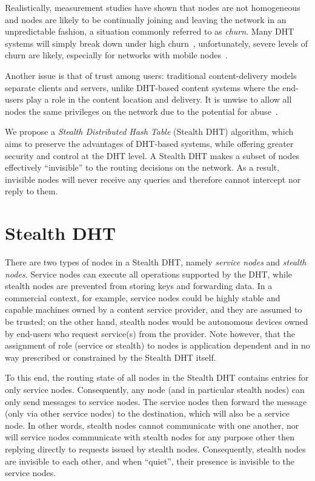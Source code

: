 \documentclass{sig-alt-release}
\begin{document}
Realistically, measurement studies have shown that nodes are not
homogeneous~\cite{sgg02} and nodes are likely to be continually
joining and leaving the network in an unpredictable fashion, a
situation commonly referred to as {\em churn}. Many DHT systems will
simply break down under high churn~\cite{churn1}, unfortunately,
severe levels of churn are likely, especially for networks with
mobile nodes~\cite{mobilechurn}\cite{dhtmanet01}.

Another issue is that of trust among users: traditional
content-delivery models separate clients and servers, unlike
DHT-based content systems where the end-users play a role in the
content location and delivery. It is unwise to allow all nodes the
same privileges on the network due to the potential for
abuse~\cite{dhtsec}\cite{DDoS_p2p05}.

We propose  a {\em Stealth Distributed Hash Table} (Stealth DHT)
algorithm, which aims to preserve the advantages of DHT-based
systems, while offering greater security and control at the DHT
level. A Stealth DHT makes a subset of nodes effectively
``invisible'' to the routing decisions on the network. As a result,
invisible nodes will never receive any queries and therefore cannot
intercept nor reply to them.

\section{Stealth DHT}
\label{sect:stealth}

There are two types of nodes in a Stealth DHT, namely {\em service
nodes} and {\em stealth nodes}. Service nodes can execute all
operations supported by the DHT, while stealth nodes are prevented
from storing keys and forwarding data. In a commercial context, for
example, service nodes could be highly stable and capable machines
owned by a content service provider, and they are assumed to be
trusted; on the other hand, stealth nodes would be autonomous
devices owned by end-users who request service(s) from the provider.
Note however, that the assignment of role (service or stealth) to
nodes is application dependent and in no way prescribed or
constrained by the Stealth DHT itself.

To this end, the routing state of all nodes in the Stealth DHT
contains entries for only service nodes. Consequently, any node (and
in particular stealth nodes) can only send messages to service
nodes. The service nodes then forward the message (only via other
service nodes) to the destination, which will also be a service
node. In other words, stealth nodes cannot communicate with one
another, nor will service nodes communicate with stealth nodes for
any purpose other then replying directly to requests issued by
stealth nodes. Consequently, stealth nodes are invisible to each
other, and when ``quiet'', their presence is invisible to the
service nodes.
\end{document}
